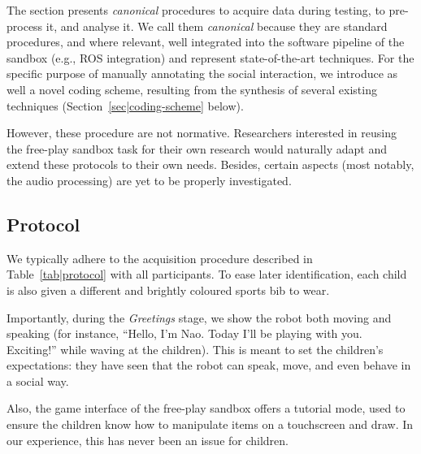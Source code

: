 \documentclass[sigconf]{acmart}
\newcommand{\eg}{e.g.,\xspace}
\begin{document}
The section presents \emph{canonical} procedures to acquire data during testing,
to pre-process it, and analyse it. We call them \emph{canonical} because they
are standard procedures, and where relevant, well integrated into the software pipeline of the sandbox (\eg ROS
integration) and represent state-of-the-art techniques. For the specific purpose
of manually annotating the social interaction, we introduce as well a novel
coding scheme, resulting from the synthesis of several existing techniques
(Section~\ref{sec|coding-scheme} below).

However, these procedure are not normative. Researchers interested in
reusing the free-play sandbox task for their own research would naturally adapt
and extend these protocols to their own needs. Besides, certain aspects (most
notably, the audio processing) are yet to be properly investigated.

\subsection{Protocol}

We typically adhere to the acquisition procedure described in
Table~\ref{tab|protocol} with all participants.  To ease later identification,
each child is also given a different and brightly coloured sports bib to wear.

Importantly, during the \emph{Greetings} stage, we show the robot both moving and
speaking (for instance, ``Hello, I'm Nao. Today I'll be playing with you.
Exciting!'' while waving at the children). This is meant to set the children's
expectations: they have seen that the robot can speak, move, and even behave in
a social way.

Also, the game interface of the free-play sandbox offers a tutorial mode, used
to ensure the children know how to manipulate items on a touchscreen and draw.
In our experience, this has never been an issue for children.


\newcommand{\tabitem}{~~\llap{\textbullet}~~}
\end{document}
